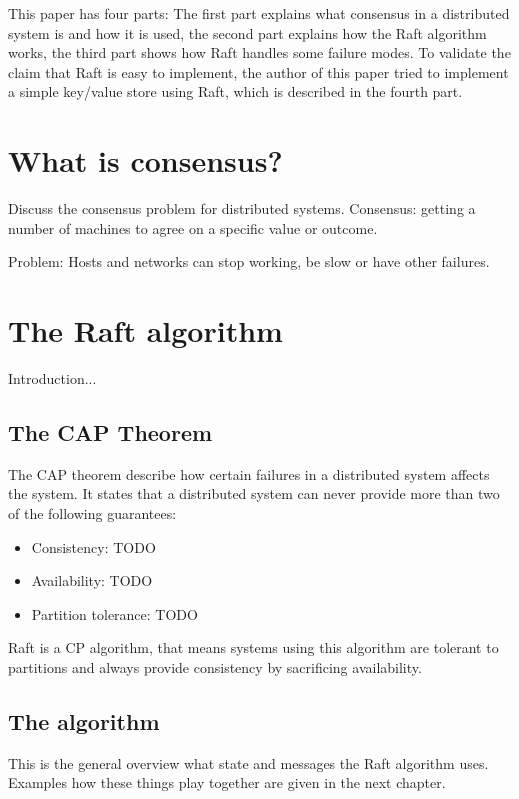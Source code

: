 This paper has four parts: The first part explains what consensus in a distributed system is and how it is used, the second part explains how the Raft algorithm works, the third part shows how Raft handles some failure modes. To validate the claim that Raft is easy to implement, the author of this paper tried to implement a simple key/value store using Raft, which is described in the fourth part.

\section{What is consensus?}

Discuss the consensus problem for distributed systems.
Consensus: getting a number of machines to agree on a specific value or outcome.

Problem: Hosts and networks can stop working, be slow or have other failures.

\section {The Raft algorithm}

Introduction...

\subsection{The CAP Theorem}

The CAP theorem describe how certain failures in a distributed system affects the system. It states that a distributed system can never provide more than two of the following guarantees:

\begin{itemize}
    \item Consistency: TODO
    \item Availability: TODO
    \item Partition tolerance: TODO
\end{itemize}

Raft is a CP algorithm, that means systems using this algorithm are tolerant to partitions and always provide consistency by sacrificing availability. 

\subsection{The algorithm}
This is the general overview what state and messages the Raft algorithm uses. Examples how these things play together are given in the next chapter.

